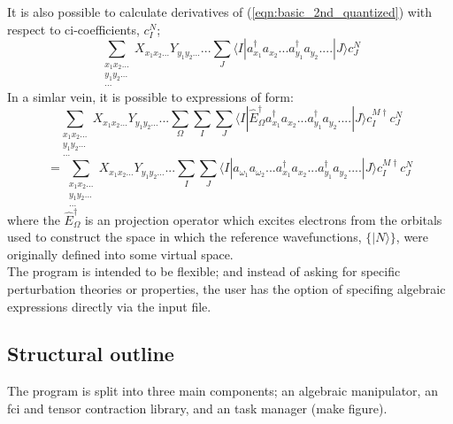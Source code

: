 \documentclass[12pt]{article}
\begin{document}
\noindent It is also possible to calculate derivatives of (\ref{eqn:basic_2nd_quantized})  with respect to ci-coefficients, $c_{I}^{N}$;
 \begin{equation}
\sum_{\substack{ x_{1}x_{2}...\\ y_{1}y_{2}... \\ ...}} X_{x_{1}x_{2}...} Y_{y_{1}y_{2}...} ...
\sum_{J}
\langle I | a^{\dagger}_{x_{1}} a_{x_{2}}...a^{\dagger}_{y_{1}}a_{y_{2}}....| J \rangle 
c^{N}_{J}
\label{eqn:ci_derivative}
\end{equation}
 \noindent In a simlar vein, it is possible to expressions of form:
\begin{equation*}
\sum_{\substack{ x_{1}x_{2}...\\ y_{1}y_{2}... \\ ...}} X_{x_{1}x_{2}...} Y_{y_{1}y_{2}...} ...
\sum_{\Omega}
\sum_{I}\sum_{J}
\langle I | \hat{E}^{\dagger}_{\Omega} a^{\dagger}_{x_{1}} a_{x_{2}}...a^{\dagger}_{y_{1}}a_{y_{2}}....| J \rangle 
 c^{M \dagger}_{I}c^{N}_{J}
\end{equation*}
\begin{equation}
=
\sum_{\substack{ x_{1}x_{2}...\\ y_{1}y_{2}... \\ ...}} X_{x_{1}x_{2}...} Y_{y_{1}y_{2}...} ...
\sum_{I}\sum_{J}
\langle I | a_{\omega_{1}} a_{\omega_{2}}.. .a^{\dagger}_{x_{1}} a_{x_{2}}...a^{\dagger}_{y_{1}}a_{y_{2}}....| J \rangle 
 c^{M \dagger}_{I}c^{N}_{J}
\label{eqn:basic_2nd_quantized_projector}
\end{equation}
 \noindent where the $\hat{E}^{\dagger}_{\Omega}$ is an projection operator
which excites electrons from the orbitals used to construct the space in which
the reference wavefunctions, $\{|N\rangle\}$, were originally defined into some
virtual space.\\

\noindent The program is intended to be flexible; and instead of asking for
specific perturbation theories or properties, the user has the option of
specifing algebraic expressions directly via the input file.


\subsection{Structural outline}
\noindent The program is split into three main components; an algebraic manipulator, an fci and tensor contraction library, and an task manager (make figure).\\
\end{document}
